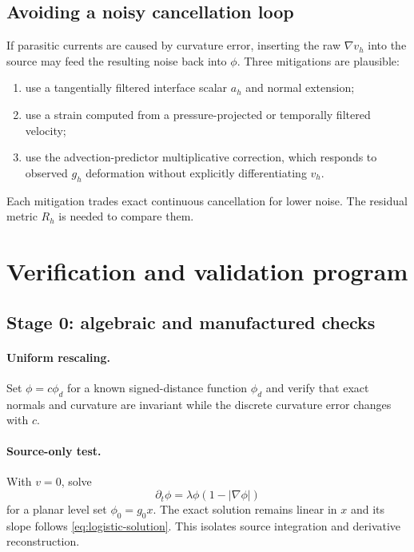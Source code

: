 \documentclass[11pt,a4paper]{article}
\theoremstyle{definition}
\theoremstyle{remark}
\newcommand{\abs}[1]{\left\lvert #1\right\rvert}
\begin{document}
\subsection{Avoiding a noisy cancellation loop}

If parasitic currents are caused by curvature error, inserting the raw $\nabla v_h$ into the source may feed the resulting noise back into $\phi$. Three mitigations are plausible:
\begin{enumerate}
  \item use a tangentially filtered interface scalar $a_h$ and normal extension;
  \item use a strain computed from a pressure-projected or temporally filtered velocity;
  \item use the advection-predictor multiplicative correction, which responds to observed $g_h$ deformation without explicitly differentiating $v_h$.
\end{enumerate}
Each mitigation trades exact continuous cancellation for lower noise. The residual metric $R_h$ is needed to compare them.

\section{Verification and validation program}

\subsection{Stage 0: algebraic and manufactured checks}

\paragraph{Uniform rescaling.}
Set $\phi=c\phi_d$ for a known signed-distance function $\phi_d$ and verify that exact normals and curvature are invariant while the discrete curvature error changes with $c$.

\paragraph{Source-only test.}
With $v=0$, solve
\begin{equation}
  \partial_t\phi=\lambda\phi(1-\abs{\nabla\phi})
\end{equation}
for a planar level set $\phi_0=g_0x$. The exact solution remains linear in $x$ and its slope follows \eqref{eq:logistic-solution}. This isolates source integration and derivative reconstruction.
\end{document}
